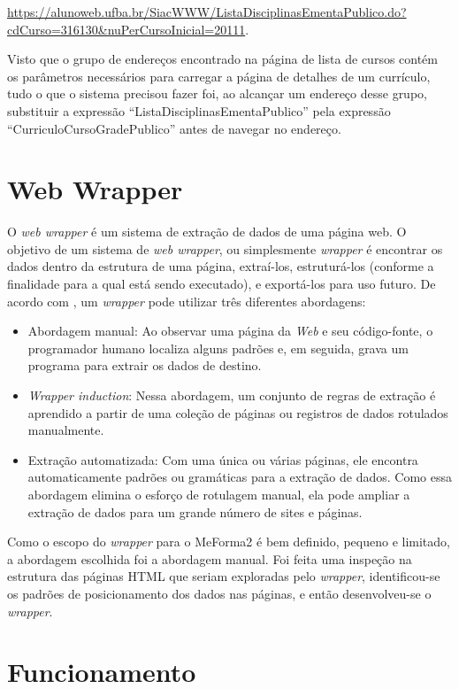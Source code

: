 \url{https://alunoweb.ufba.br/SiacWWW/ListaDisciplinasEmentaPublico.do?cdCurso=316130\&nuPerCursoInicial=20111}.

Visto que o grupo de endereços encontrado na página de lista de cursos contém os parâmetros necessários para carregar a página de detalhes de um currículo, tudo o que o sistema precisou fazer foi, ao alcançar um endereço desse grupo, substituir a expressão ``ListaDisciplinasEmentaPublico'' pela expressão ``CurriculoCursoGradePublico'' antes de navegar no endereço.

\section{Web Wrapper}
O \textit{web wrapper} é um sistema de extração de dados de uma página web. O objetivo de um sistema de \textit{web wrapper}, ou simplesmente \textit{wrapper} é encontrar os dados dentro da estrutura de uma página, extraí-los, estruturá-los (conforme a finalidade para a qual está sendo executado), e exportá-los para uso futuro. De acordo com \cite{liu}, um \textit{wrapper} pode utilizar três diferentes abordagens:
\begin{itemize}
    \item Abordagem manual: Ao observar uma página da \textit{Web} e seu código-fonte, o programador humano localiza alguns padrões e, em seguida, grava um programa para extrair os dados de destino.
    \item \textit{Wrapper induction}: Nessa abordagem, um conjunto de regras de extração é aprendido a partir de uma coleção de páginas ou registros de dados rotulados manualmente.
    \item Extração automatizada: Com uma única ou várias páginas, ele encontra automaticamente padrões ou gramáticas para a extração de dados. Como essa abordagem elimina o esforço de rotulagem manual, ela pode ampliar a extração de dados para um grande número de sites e páginas.
\end{itemize}

Como o escopo do \textit{wrapper} para o MeForma2 é bem definido, pequeno e limitado, a abordagem escolhida foi a abordagem manual. Foi feita uma inspeção na estrutura das páginas HTML que seriam exploradas pelo \textit{wrapper}, identificou-se os padrões de posicionamento dos dados nas páginas, e então desenvolveu-se o \textit{wrapper}.

\section{Funcionamento}

